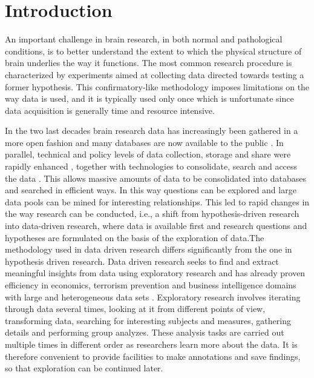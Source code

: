 \documentclass[twocolumn]{svjour3} %
\begin{document}
\section{Introduction}


An important challenge in brain research, in both normal and pathological conditions, is to better understand the extent to which the physical structure of brain underlies the way it functions. The most common research procedure is characterized by experiments aimed at collecting data directed towards testing a former hypothesis. This confirmatory-like methodology imposes limitations on the way data is used, and it is typically used only once which is unfortunate since data acquisition is generally time and resource intensive.

In the two last decades brain research data has increasingly been gathered in a more open fashion and many databases are now available to the public \cite{milham_open_2012}. In parallel, technical and policy levels of data collection, storage and share were rapidly enhanced \cite{eckersley_neuroscience_2003}, together with technologies to consolidate, search and access the data \cite{van_horn_is_2009}\cite{wood_harnessing_2014}. 
This allows massive amounts of data to be consolidated into databases and searched in efficient ways.  In this way questions can be explored and large data pools can be mined for interesting relationships. This led to rapid changes in the way research can be conducted, i.e., a shift from hypothesis-driven research into data-driven research, where data is available first and research questions and hypotheses are formulated on the basis of the exploration of data.The methodology used in data driven research differs significantly from the one in hypothesis driven research. Data driven research seeks to find and extract meaningful insights from data using exploratory research \cite{tukey_we_1980} and has already proven efficiency in economics, terrorism prevention and business intelligence domains with large and heterogeneous data sets \cite{cook_illuminating_2005}. Exploratory research involves iterating through data several times, looking at it from different points of view, transforming data, searching for interesting subjects and measures, gathering details and performing group analyzes. These analysis tasks are carried out multiple times in different order as researchers learn more about the data. It is therefore convenient to provide facilities to make annotations and save findings, so that exploration can be continued later.
\end{document}
